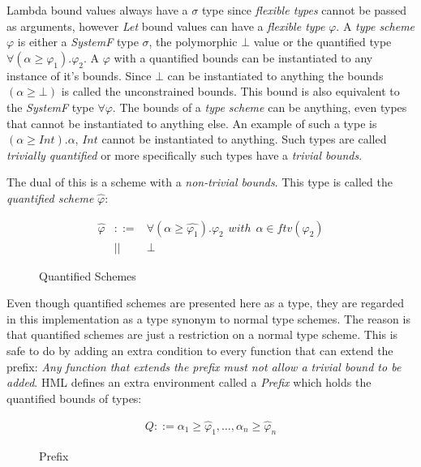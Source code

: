 Lambda bound values always have a $\sigma$ type since \emph{flexible types} cannot be passed as arguments, however \emph{Let} bound values can have a \emph{flexible type} $\varphi$.
A \emph{type scheme} $\varphi$ is either a \emph{SystemF} type $\sigma$, the polymorphic $\bot$ value or the quantified type $\forall (\alpha \geq \varphi_1). \varphi_2$. A $\varphi$ with a quantified bounds can be instantiated to any instance of it's bounds. Since $\bot$ can be instantiated to anything the bounds $(\alpha \geq \bot)$ is called the unconstrained bounds. This bound is also equivalent to the \emph{SystemF} type $\forall \varphi$. The bounds of a \emph{type scheme} can be anything, even types that cannot be instantiated to anything else. An example of such a type is $(\alpha \geq Int).\alpha$, $Int$ cannot be instantiated to anything. Such types are called \emph{trivially quantified} or more specifically such types have a \emph{trivial bounds}.

The dual of this is a scheme with a \emph{non-trivial bounds}. This type is called the \emph{quantified scheme} $\hat{\varphi}$:

\begin{figure}[H]
\begin{eqnarray*}
\hat{\varphi} & ::= & \forall (\alpha \geq \hat{\varphi_1}). \varphi_2 \hspace{5pt} with \hspace{5pt} \alpha \in ftv(\varphi_2) \\
              & || & \bot
\end{eqnarray*}
\caption{Quantified Schemes}
\label{quantified-schemes}
\end{figure}

Even though quantified schemes are presented here as a type, they are regarded in this implementation as a type synonym to normal type schemes. The reason is that quantified schemes are just a restriction on a normal type scheme. This is safe to do by adding an extra condition to every function that can extend the prefix: \emph{Any function that extends the prefix must not allow a trivial bound to be added}.
HML defines an extra environment called a \emph{Prefix} which holds the quantified bounds of types:

\begin{figure}[H]
\begin{eqnarray*}
Q ::= \alpha_1\geq\hat{\varphi}_1,\ldots,\alpha_n\geq\hat{\varphi}_n
\end{eqnarray*}
\caption{Prefix}
\label{Prefix}
\end{figure}

